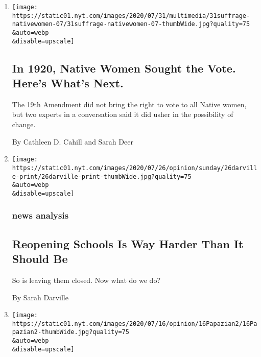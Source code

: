 \begin{enumerate}
\def\labelenumi{\arabic{enumi}.}
\item
  \href{/2020/07/31/style/19th-amendment-native-womens-suffrage.html}{}

  \texttt{[image: https://static01.nyt.com/images/2020/07/31/multimedia/31suffrage-nativewomen-07/31suffrage-nativewomen-07-thumbWide.jpg?quality=75\\\&auto=webp\\\&disable=upscale]}

  \hypertarget{in-1920-native-women-sought-the-vote-heres-whats-next}{%
  \subsection{In 1920, Native Women Sought the Vote. Here's What's
  Next.}\label{in-1920-native-women-sought-the-vote-heres-whats-next}}

  The 19th Amendment did not bring the right to vote to all Native
  women, but two experts in a conversation said it did usher in the
  possibility of change.

  By Cathleen D. Cahill and Sarah Deer
\item
  \href{/2020/07/23/sunday-review/reopening-schools-coronavirus.html}{}

  \texttt{[image: https://static01.nyt.com/images/2020/07/26/opinion/sunday/26darville-print/26darville-print-thumbWide.jpg?quality=75\\\&auto=webp\\\&disable=upscale]}

  \hypertarget{news-analysis}{%
  \subsubsection{news analysis}\label{news-analysis}}

  \hypertarget{reopening-schools-is-way-harder-than-it-should-be}{%
  \subsection{Reopening Schools Is Way Harder Than It Should
  Be}\label{reopening-schools-is-way-harder-than-it-should-be}}

  So is leaving them closed. Now what do we do?

  By Sarah Darville
\item
  \href{/2020/07/16/opinion/culture/mashrou-leila-fan-suicide.html}{}

  \texttt{[image: https://static01.nyt.com/images/2020/07/16/opinion/16Papazian2/16Papazian2-thumbWide.jpg?quality=75\\\&auto=webp\\\&disable=upscale]}


\end{enumerate}

